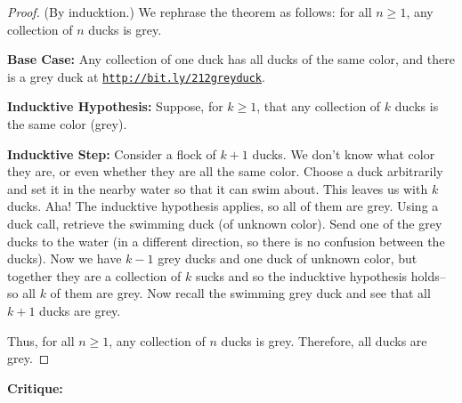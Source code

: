 \documentclass[11pt]{article}		%
\theoremstyle{definition}
\begin{document}
\begin{proof}
(By inducktion.)
We rephrase the theorem as follows: for all $n\ge 1$, any collection of $n$ ducks is grey.

\textbf{Base Case:} Any collection of one duck has all ducks of the same color, and there is a grey duck at {\tt \href{http://bit.ly/212greyduck}{http://bit.ly/212greyduck}}.

\textbf{Inducktive Hypothesis:} Suppose, for $k \ge 1$, that any collection of $k$ ducks is the same color (grey).

\textbf{Inducktive Step:} Consider a flock of $k+1$ ducks. We don't know what color they are, or even whether they are all the same color. Choose a duck arbitrarily and set it in the nearby water so that it can swim about. This leaves us with $k$ ducks. Aha! The inducktive hypothesis applies, so all of them are grey. Using a duck call, retrieve the swimming duck (of unknown color). Send one of the grey ducks to the water (in a different direction, so there is no confusion between the ducks). Now we have $k-1$ grey ducks and one duck of unknown color, but together they are a collection of $k$ sucks and so the inducktive hypothesis holds--so all $k$ of them are grey. Now recall the swimming grey duck and see that all $k+1$ ducks are grey.

Thus, for all $n \ge 1$, any collection of $n$ ducks is grey. Therefore, all ducks are grey.
\end{proof}


\noindent\textbf{Critique:} 
\end{document}
